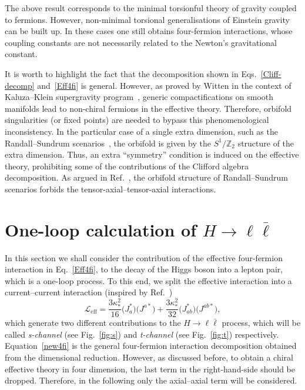 \documentclass{ws-mpla}
\newcommand{\Lag}{\mathscr{L}}
\renewcommand{\(}{\left(}
\renewcommand{\)}{\right)}
\renewcommand{\[}{\left[}
\renewcommand{\]}{\right]}
\begin{document}
The above result corresponds to the minimal torsionful theory of gravity coupled to fermions. However, non-minimal torsional generalisations of Einstein gravity can be built up. In these cases one still obtains four-fermion interactions, whose coupling constants are not necessarily related to the Newton's gravitational constant.\cite{Belyaev:1997zv,Belyaev:1998ax,Belyaev:2007fn,Fabbri:2011kq}

It is worth to highlight the fact that the decomposition shown in Eqs.~\eqref{Cliff-decomp} and~\eqref{Eff4fi} is general. However, as proved by Witten in the context of Kaluza--Klein supergravity  program~\cite{Witten:1981me}, generic compactifications on smooth manifolds lead to non-chiral fermions in the effective theory. Therefore, orbifold singularities (or fixed points) are needed to bypass this phenomenological inconsistency. In the particular case of a single extra dimension, such as the Randall--Sundrum scenarios~\cite{RS1,RS2}, the orbifold is given by the $S^1 / \mathbb{Z}_2$ structure of the extra dimension. Thus, an extra ``symmetry'' condition is induced on the effective theory, prohibiting some of the contributions of the Clifford algebra decomposition. As argued in Ref.~, the orbifold structure of Randall--Sundrum scenarios forbids the tensor-axial--tensor-axial interactions.


\section{One-loop calculation of $H \to \ell \bar{\ell}$}\label{1loop}

In this section we shall consider the contribution of the effective four-fermion interaction in Eq.~\eqref{Eff4fi}, to the decay of the Higgs boson into a lepton pair, which is a one-loop process. To this end, we split the effective interaction into a current--current interaction (inspired by Ref.~)
\begin{equation}
  \Lag_{\text{eff}} = \frac{3 \kappa_*^2}{16} \big( J_{a}^* \big) \big( J^{a*} \big) + \frac{3 \kappa_*^2}{32} \big( J_{ab}^* \big) \big( J^{ab*} \big),
  \label{new4fi}
\end{equation}
which generate two different contributions to the $H \to \ell \bar{\ell}$ process, which will be called \emph{s-channel} (see Fig.~\ref{fig:s}) and \emph{t-channel} (see Fig.~\ref{fig:t}) respectively. Equation~\eqref{new4fi} is the general four-fermion interaction decomposition obtained from the dimensional reduction. However, as discussed before, to obtain a chiral effective theory in four dimension, the last term in the right-hand-side should be dropped. Therefore, in the following only the axial--axial term will be considered.
\end{document}
